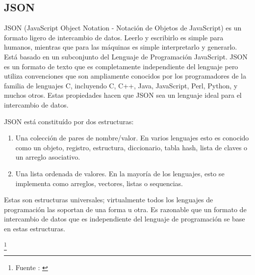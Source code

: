 \subsection{JSON}
\label{json}
JSON (JavaScript Object Notation - Notación de Objetos de JavaScript) es un formato ligero de intercambio de datos. Leerlo y escribirlo es simple para humanos, mientras que para las máquinas es simple interpretarlo y generarlo. Está basado en un subconjunto del Lenguaje de Programación JavaScript. JSON es un formato de texto que es completamente independiente del lenguaje pero utiliza convenciones que son ampliamente conocidos por los programadores de la familia de lenguajes C, incluyendo C, C++, Java, JavaScript, Perl, Python, y muchos otros. Estas propiedades hacen que JSON sea un lenguaje ideal para el intercambio de datos.

JSON está constituído por dos estructuras:
\begin{enumerate}

\item Una colección de pares de nombre/valor. En varios lenguajes esto es conocido como un objeto, registro, estructura, diccionario, tabla hash, lista de claves o un arreglo asociativo.
\item Una lista ordenada de valores. En la mayoría de los lenguajes, esto se implementa como arreglos, vectores, listas o sequencias.
\end{enumerate}
Estas son estructuras universales; virtualmente todos los lenguajes de programación las soportan de una forma u otra. Es razonable que un formato de intercambio de datos que es independiente del lenguaje de programación se base en estas estructuras.

\footnote{Fuente : \cite{JSON}}